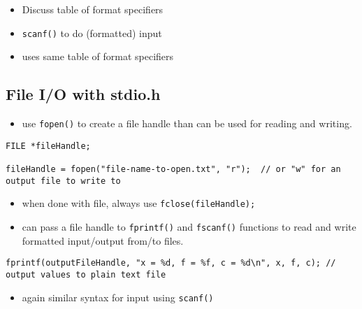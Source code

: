 \documentclass[11pt]{article}
\begin{document}
\begin{itemize}
\item Discuss table of format specifiers
\item \verb~scanf()~ to do (formatted) input
\item uses same table of format specifiers
\end{itemize}
\subsection{File I/O with stdio.h}
\label{sec-3-2}

\begin{itemize}
\item use \verb~fopen()~  to create a file handle than can be used for reading and
writing.
\end{itemize}

\begin{verbatim}
FILE *fileHandle;

fileHandle = fopen("file-name-to-open.txt", "r");  // or "w" for an output file to write to
\end{verbatim}

\begin{itemize}
\item when done with file, always use \verb~fclose(fileHandle);~
\item can pass a file handle to \verb~fprintf()~ and \verb~fscanf()~ functions to read
and write formatted input/output from/to files.
\end{itemize}

\begin{verbatim}
fprintf(outputFileHandle, "x = %d, f = %f, c = %d\n", x, f, c); // output values to plain text file
\end{verbatim}

\begin{itemize}
\item again similar syntax for input using \verb~scanf()~
\end{itemize}
\end{document}
